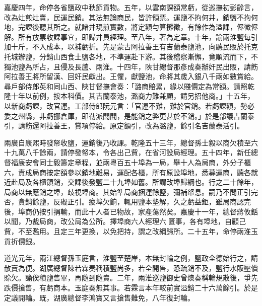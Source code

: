 \begin{pinyinscope}
嘉慶四年，命停各省鹽政中秋節貢物。五年，以雲南課額常虧，從巡撫初彭齡言，改為灶煎灶賣，民運民銷。其法無論商民，皆許領票。運鹽不拘何井，銷鹽不拘何地，完課後聽其所之。就諸井現煎實數，將定額勻算攤徵，有餘作為溢課，侭徵侭解。所有放票收課事宜，即歸井員經理。至八年，著為定章。十年，諭兩淮鹽每引加十斤，不入成本，以補虧折。先是蒙古阿拉善王有吉蘭泰鹽池，向聽民販於托克托城辦鹽，分銷山西食土鹽各地，不準運赴下游。其後稽察漸懈，竟順流而下，不獨池鹽為所占，且侵及長蘆、兩淮。十四年，陜甘總督那彥成奏辦奸民出販，請飭阿拉善王將所留漢、回奸民獻出。王懼，獻鹽池，命將其歲入銀八千兩如數賞給。尋戶部侍郎英和同山西、陜甘督撫會奏：「潞商賠累，緣以賤價定為常額。請照乾隆十年以前例，按本科價。其吉蘭泰池，潞商力難兼顧，請另招他商。」十五年，以新商虧課，改官運。工部侍郎阮元言：「官運不難，難於官銷。若虧課額，勢必委之州縣，非虧挪倉庫，即勒派閭閻，是能銷之弊更甚於不銷。」於是部議吉蘭泰引，請飭還阿拉善王，賞項停給。原定額引，改為潞鹽，餘引名吉蘭泰活引。

兩廣自康熙時發帑收鹽，運銷後乃收課。乾隆五十三年，總督孫士毅以商欠積至六十九萬八千餘兩，請停發帑本，令各出己貲，在省河設局經理。五十四年，新任總督福康安會同士毅籌定章程，並兩粵百五十埠為一局，舉十人為局商，外分子櫃六，責成局商按定額參以銷地難易，運配各櫃，所有原設埠地，悉募運商，聽各就近赴局及各櫃領銷，交課後發鹽二十九埠如舊。所謂改埠歸綱也。行之二十餘年，局商以無應銷之埠，歧視埠商。其始準局商捆運餘鹽，彌補帑息。嗣乃不問正引完否，貪銷餘鹽，反礙正引。疲埠欠餉，輒用鹽本墊解，久之虧益鉅，雖局商認完後，埠商仍按引捐輸，而此十人者已物故，家產蕩然矣。嘉慶十一年，總督蔣攸銛以聞，乃裁局商，改公局為公所。擇埠商六人經理六匱事，各有埠地，自顧己貲，不至濫用。且定三年更換，以免把持，謂之改綱歸所。二十五年，命停兩淮玉貢折價銀。

道光元年，兩江總督孫玉庭言，淮鹽至楚岸，本無封輪之例，鹽政全德始行之，請散賣為便。湖廣總督陳若霖奏稱積鹽尚多，若全開售，恐疏銷不及，鹽行水販壓價賒欠。諭俟積鹽售畢，再隨到隨賣。二年，兩淮巡鹽御史曾燠奏稱輪規散後，爭先跌價搶售，有虧商本。玉庭奏無其事。若霖言本年較前實溢銷二十六萬餘引。於是定議開輪。既，湖廣總督李鴻寶又言搶售難免，八年復封輪。


\end{pinyinscope}
